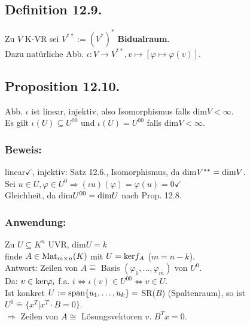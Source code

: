 \documentclass[a4paper, 12pt]{extarticle}
\newcommand{\tn}[1]{\textnormal {#1}}
\begin{document}
\subsection*{Definition 12.9.}
Zu $V$ K-VR sei $V^{**} := (V^*)^*$ \textbf{Bidualraum}.\\
Dazu natürliche Abb. $\iota: V \longrightarrow V^{**}, v \mapsto [\varphi\mapsto\varphi(v)]$.
\subsection*{Proposition 12.10.}
Abb. $\iota$ ist linear, injektiv, also Isomorphismus falls dim$V < \infty$.\\
Es gilt $\iota(U) \subseteq U^{00}$ und $\iota(U) = U^{00}$ falls dim$V < \infty$.
\subsubsection*{Beweis:}
linear$\checkmark$, injektiv: Satz 12.6., Isomorphismus, da dim$V^{**} = \tn{dim}V$.\\
Sei $u\in U, \varphi\in U^0 \Rightarrow (\iota u)(\varphi) = \varphi(u) = 0 \checkmark$\\
Gleichheit, da dim$U^{00} = \tn{dim} U$ nach Prop. 12.8.
\subsubsection*{Anwendung:}
Zu $U \subseteq K^n$ UVR, dim$U = k$\\
finde $A \in \tn{Mat}_{m\times n}(K)$ mit $U = \tn{ker}f_A$ ($m = n-k$).\\
Antwort: Zeilen von $A \hat{=}$ Basis $(\varphi_1, \dots, \varphi_m)$ von $U^0$.\\
Da: $v \in \tn{ker}\varphi_i$ f.a. $i \Leftrightarrow \iota(v) \in U^{00} \Leftrightarrow v \in U$.\\
Ist konkret $U := \tn{span}\{u_1, \dots, u_k\} =$ SR($B$) (Spaltenraum), so ist $U^0 \hat{=}\{x^T | x^T\cdot B = 0\}$.\\
$\Rightarrow$ Zeilen von $A \cong$ Lösungsvektoren $v$. $B^Tx = 0$.
\end{document}
